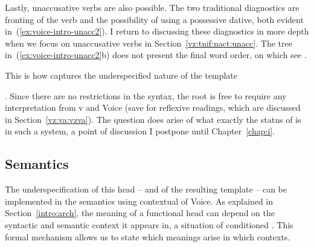 \begin{exe}
\begin{xlist}
\begin{exe}
\begin{xlist}
\begin{exe}
\begin{xlist}
\begin{exe}
\begin{exe}
\begin{xlist}
\begin{exe}
\begin{xlist}
\begin{exe}
\begin{xlist}
\begin{exe}
\begin{xlist}
\begin{exe}
\begin{xlist}
\begin{exe}
\begin{xlist}
\begin{exe}
\begin{xlist}
\begin{exe}
\begin{xlist}
\begin{exe}
\begin{xlist}
\begin{exe}
\begin{xlist}
\begin{exe}
\begin{xlist}
\begin{exe}
\begin{xlist}
\begin{exe}
\begin{xlist}
\begin{exe}
\begin{exe}
\begin{xlist}
\begin{exe}
\begin{xlist}
\begin{exe}
\begin{xlist}
Lastly, unaccusative verbs are also possible. The two traditional diagnostics are fronting of the verb and the possibility of using a possessive dative, both evident in~(\ref{ex:voice-intro-unacc2}). I return to discussing these diagnostics in more depth when we focus on unaccusative verbs in Section~\ref{vz:tnif:nact:unacc}. The tree in~(\ref{ex:voice-intro-unacc2}b) does not present the final word order, on which see \cite{preminger10}.

 \begin{exe}
 \ex \label{ex:voice-intro-unacc2} 
 \begin{xlist} 
	
 	 \z
\z 		

This is how  captures the underspecified nature of the template {\tkal. Since there are no restrictions in the syntax, the root is free to require any interpretation from v and Voice (save for reflexive readings, which are discussed in Section~\ref{vz:va:vzva}). The question does arise of what exactly the status of  is in such a system, a point of discussion I postpone until Chapter~\ref{chap:i}.

		
		\subsection{Semantics} \label{voice:voice:sem}
The underspecification of this head -- and of the resulting template -- can be implemented in the semantics using contextual  of Voice. As explained in Section~\ref{intro:arch}, the meaning of a functional head can depend on the syntactic and semantic context it appears in, a situation of conditioned . This formal mechanism allows us to state which meanings arise in which contexts.

}
\end{xlist}
\end{exe}
\end{xlist}
\end{exe}
\end{xlist}
\end{exe}
\end{xlist}
\end{exe}
\end{exe}
\end{xlist}
\end{exe}
\end{xlist}
\end{exe}
\end{xlist}
\end{exe}
\end{xlist}
\end{exe}
\end{xlist}
\end{exe}
\end{xlist}
\end{exe}
\end{xlist}
\end{exe}
\end{xlist}
\end{exe}
\end{xlist}
\end{exe}
\end{xlist}
\end{exe}
\end{xlist}
\end{exe}
\end{xlist}
\end{exe}
\end{xlist}
\end{exe}
\end{exe}
\end{xlist}
\end{exe}
\end{xlist}
\end{exe}
\end{xlist}
\end{exe}
